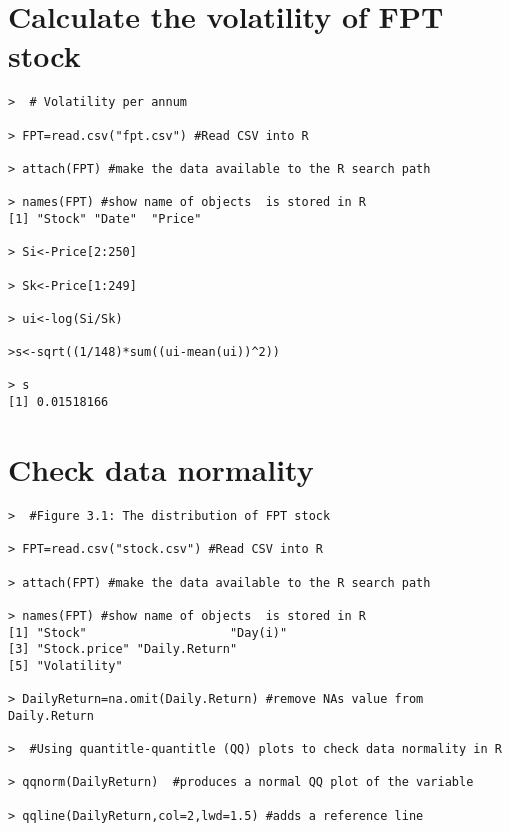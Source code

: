 \newpage
\section{ Calculate the volatility of FPT stock}
\begin{lstlisting}
>  # Volatility per annum

> FPT=read.csv("fpt.csv") #Read CSV into R 

> attach(FPT) #make the data available to the R search path

> names(FPT) #show name of objects  is stored in R
[1] "Stock" "Date"  "Price"

> Si<-Price[2:250]	

> Sk<-Price[1:249]	

> ui<-log(Si/Sk)

>s<-sqrt((1/148)*sum((ui-mean(ui))^2))

> s
[1] 0.01518166

\end{lstlisting}

\newpage

\section{Check data normality}
\begin{lstlisting}
>  #Figure 3.1: The distribution of FPT stock 

> FPT=read.csv("stock.csv") #Read CSV into R 

> attach(FPT) #make the data available to the R search path

> names(FPT) #show name of objects  is stored in R
[1] "Stock"                    "Day(i)"                 
[3] "Stock.price" "Daily.Return"            
[5] "Volatility"  

> DailyReturn=na.omit(Daily.Return) #remove NAs value from Daily.Return

>  #Using quantitle-quantitle (QQ) plots to check data normality in R

> qqnorm(DailyReturn)  #produces a normal QQ plot of the variable

> qqline(DailyReturn,col=2,lwd=1.5) #adds a reference line
\end{lstlisting}

\newpage
